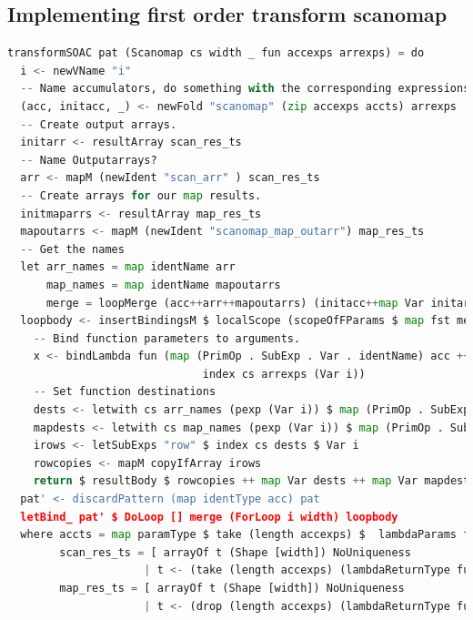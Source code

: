 \documentclass[11pt]{article}
\begin{document}
\subsection{Implementing first order transform scanomap}
\begin{lstlisting}[language=Python,caption=Scanomap first order transform] 
transformSOAC pat (Scanomap cs width _ fun accexps arrexps) = do
  i <- newVName "i"
  -- Name accumulators, do something with the corresponding expressions
  (acc, initacc, _) <- newFold "scanomap" (zip accexps accts) arrexps
  -- Create output arrays.
  initarr <- resultArray scan_res_ts
  -- Name Outputarrays?
  arr <- mapM (newIdent "scan_arr" ) scan_res_ts
  -- Create arrays for our map results.
  initmaparrs <- resultArray map_res_ts
  mapoutarrs <- mapM (newIdent "scanomap_map_outarr") map_res_ts
  -- Get the names
  let arr_names = map identName arr
      map_names = map identName mapoutarrs
      merge = loopMerge (acc++arr++mapoutarrs) (initacc++map Var initarr ++ map Var initmaparrs)
  loopbody <- insertBindingsM $ localScope (scopeOfFParams $ map fst merge) $ do
    -- Bind function parameters to arguments.
    x <- bindLambda fun (map (PrimOp . SubExp . Var . identName) acc ++
                              index cs arrexps (Var i))
    -- Set function destinations
    dests <- letwith cs arr_names (pexp (Var i)) $ map (PrimOp . SubExp) (take (length accexps) x)
    mapdests <- letwith cs map_names (pexp (Var i)) $ map (PrimOp . SubExp) (drop (length accexps) x)
    irows <- letSubExps "row" $ index cs dests $ Var i
    rowcopies <- mapM copyIfArray irows
    return $ resultBody $ rowcopies ++ map Var dests ++ map Var mapdests
  pat' <- discardPattern (map identType acc) pat
  letBind_ pat' $ DoLoop [] merge (ForLoop i width) loopbody
  where accts = map paramType $ take (length accexps) $  lambdaParams fun
        scan_res_ts = [ arrayOf t (Shape [width]) NoUniqueness
                     | t <- (take (length accexps) (lambdaReturnType fun))]
        map_res_ts = [ arrayOf t (Shape [width]) NoUniqueness
                     | t <- (drop (length accexps) (lambdaReturnType fun))]
\end{lstlisting}
\end{document}
